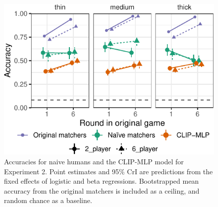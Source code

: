 \documentclass[10pt, letterpaper]{article}
\begin{document}
\begin{CodeChunk}
\begin{figure}[t]

{\centering \includegraphics[width=0.9\linewidth]{figs/fig-condition-1} 

}

\caption[Accuracies for naive humans and the CLIP-MLP model for Experiment 2]{Accuracies for naive humans and the CLIP-MLP model for Experiment 2. Point estimates and 95\% CrI are predictions from the fixed effects of logistic and beta regressions. Bootstrapped mean accuracy from the original matchers is included as a ceiling, and random chance as a baseline. \label{expt2-condition}}\label{fig:fig-condition}
\end{figure}
\end{CodeChunk}
\end{document}
